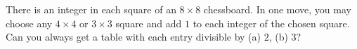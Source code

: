 There is an integer in each square of an $8 \times 8$ chessboard. In one move, you may choose any $4 \times 4$ or $3 \times 3$ square and add $1$ to each integer of the chosen square. Can you always get a table with each entry divisible by (a) $2$, (b) $3$?
